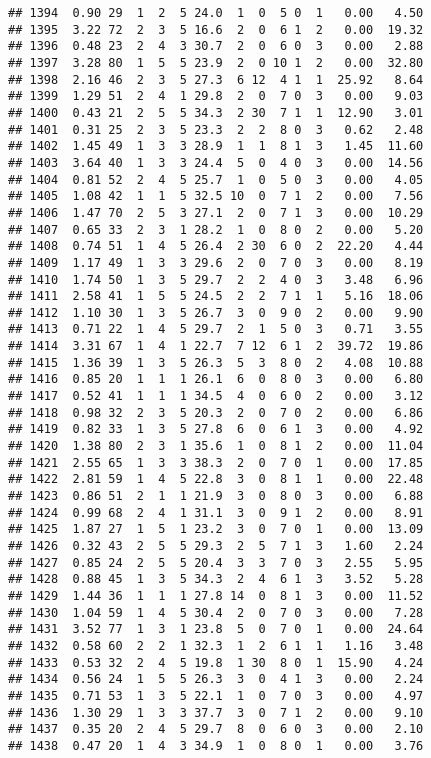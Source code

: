 \documentclass[
]{article}
\begin{document}
\begin{verbatim}
## 1394  0.90 29  1  2  5 24.0  1  0  5 0  1   0.00   4.50
## 1395  3.22 72  2  3  5 16.6  2  0  6 1  2   0.00  19.32
## 1396  0.48 23  2  4  3 30.7  2  0  6 0  3   0.00   2.88
## 1397  3.28 80  1  5  5 23.9  2  0 10 1  2   0.00  32.80
## 1398  2.16 46  2  3  5 27.3  6 12  4 1  1  25.92   8.64
## 1399  1.29 51  2  4  1 29.8  2  0  7 0  3   0.00   9.03
## 1400  0.43 21  2  5  5 34.3  2 30  7 1  1  12.90   3.01
## 1401  0.31 25  2  3  5 23.3  2  2  8 0  3   0.62   2.48
## 1402  1.45 49  1  3  3 28.9  1  1  8 1  3   1.45  11.60
## 1403  3.64 40  1  3  3 24.4  5  0  4 0  3   0.00  14.56
## 1404  0.81 52  2  4  5 25.7  1  0  5 0  3   0.00   4.05
## 1405  1.08 42  1  1  5 32.5 10  0  7 1  2   0.00   7.56
## 1406  1.47 70  2  5  3 27.1  2  0  7 1  3   0.00  10.29
## 1407  0.65 33  2  3  1 28.2  1  0  8 0  2   0.00   5.20
## 1408  0.74 51  1  4  5 26.4  2 30  6 0  2  22.20   4.44
## 1409  1.17 49  1  3  3 29.6  2  0  7 0  3   0.00   8.19
## 1410  1.74 50  1  3  5 29.7  2  2  4 0  3   3.48   6.96
## 1411  2.58 41  1  5  5 24.5  2  2  7 1  1   5.16  18.06
## 1412  1.10 30  1  3  5 26.7  3  0  9 0  2   0.00   9.90
## 1413  0.71 22  1  4  5 29.7  2  1  5 0  3   0.71   3.55
## 1414  3.31 67  1  4  1 22.7  7 12  6 1  2  39.72  19.86
## 1415  1.36 39  1  3  5 26.3  5  3  8 0  2   4.08  10.88
## 1416  0.85 20  1  1  1 26.1  6  0  8 0  3   0.00   6.80
## 1417  0.52 41  1  1  1 34.5  4  0  6 0  2   0.00   3.12
## 1418  0.98 32  2  3  5 20.3  2  0  7 0  2   0.00   6.86
## 1419  0.82 33  1  3  5 27.8  6  0  6 1  3   0.00   4.92
## 1420  1.38 80  2  3  1 35.6  1  0  8 1  2   0.00  11.04
## 1421  2.55 65  1  3  3 38.3  2  0  7 0  1   0.00  17.85
## 1422  2.81 59  1  4  5 22.8  3  0  8 1  1   0.00  22.48
## 1423  0.86 51  2  1  1 21.9  3  0  8 0  3   0.00   6.88
## 1424  0.99 68  2  4  1 31.1  3  0  9 1  2   0.00   8.91
## 1425  1.87 27  1  5  1 23.2  3  0  7 0  1   0.00  13.09
## 1426  0.32 43  2  5  5 29.3  2  5  7 1  3   1.60   2.24
## 1427  0.85 24  2  5  5 20.4  3  3  7 0  3   2.55   5.95
## 1428  0.88 45  1  3  5 34.3  2  4  6 1  3   3.52   5.28
## 1429  1.44 36  1  1  1 27.8 14  0  8 1  3   0.00  11.52
## 1430  1.04 59  1  4  5 30.4  2  0  7 0  3   0.00   7.28
## 1431  3.52 77  1  3  1 23.8  5  0  7 0  1   0.00  24.64
## 1432  0.58 60  2  2  1 32.3  1  2  6 1  1   1.16   3.48
## 1433  0.53 32  2  4  5 19.8  1 30  8 0  1  15.90   4.24
## 1434  0.56 24  1  5  5 26.3  3  0  4 1  3   0.00   2.24
## 1435  0.71 53  1  3  5 22.1  1  0  7 0  3   0.00   4.97
## 1436  1.30 29  1  3  3 37.7  3  0  7 1  2   0.00   9.10
## 1437  0.35 20  2  4  5 29.7  8  0  6 0  3   0.00   2.10
## 1438  0.47 20  1  4  3 34.9  1  0  8 0  1   0.00   3.76

\end{verbatim}
\end{document}
